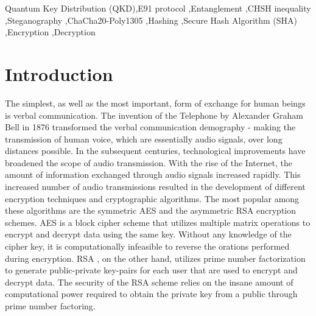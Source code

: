 \documentclass[a4paper]{cas-sc}
\begin{document}
\begin{abstract}
\end{abstract}



\begin{keywords}
    Quantum Key Distribution (QKD)\sep E91 protocol \sep Entanglement \sep CHSH inequality \sep Steganography \sep ChaCha20-Poly1305 \sep Hashing \sep Secure Hash Algorithm (SHA) \sep Encryption \sep Decryption
\end{keywords}


\maketitle


\section{Introduction}
The simplest, as well as the most important, form of exchange for human beings is verbal communication. The invention of the Telephone by Alexander Graham Bell in 1876 transformed the verbal communication demography - making the transmission of human voice, which are essentially audio signals, over long distances possible. In the subsequent centuries, technological improvements have broadened the scope of audio transmission. With the rise of the Internet, the amount of information exchanged through audio signals increased rapidly. This increased number of audio transmissions resulted in the development of different encryption techniques and cryptographic algorithms. The most popular among these algorithms are the symmetric AES and the asymmetric RSA encryption schemes. AES \cite{rijmen2001advanced} is a block cipher scheme that utilizes multiple matrix operations to encrypt and decrypt data using the same key. Without any knowledge of the cipher key, it is computationally infeasible to reverse the orations performed during encryption. RSA \cite{rivest1978method}, on the other hand, utilizes prime number factorization to generate public-private key-pairs for each user that are used to encrypt and decrypt data. The security of the RSA scheme relies on the insane amount of computational power required to obtain the private key from a public through prime number factoring.
\end{document}
